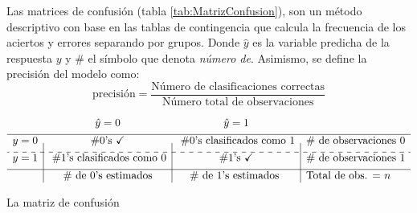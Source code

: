 \documentclass[../Main/Main.tex]{subfiles}
\begin{document}
Las matrices de confusión (tabla \ref{tab:MatrizConfusion}), son un método descriptivo con base en las tablas de contingencia que calcula la frecuencia de los aciertos y errores separando por grupos. Donde $\hat{y}$ es la variable predicha de la respuesta $y$ y $\#$ el símbolo que denota \textit{número de}. Asimismo, se define la precisión del modelo como:
$$ \text{precisión} = \dfrac{\text{Número de clasificaciones correctas}}{\text{Número total de observaciones}}$$

\begin{table}[H]
\centering
$\begin{array}{c|c|c|l}
~ & \hat{y} = 0 & \hat{y} = 1 & ~ \\[4pt]
\hline
y = 0 & \#0\text{'s } \checkmark & \;\# 0\text{'s clasificados como }1 & \#\text{ de observaciones 0} \\[4pt]
\cdashline{1-4}
y = 1 & \;\# 1\text{'s clasificados como }0 & \# 1\text{'s } \checkmark & \#\text{ de observaciones 1} \\[4pt]
\hline
~ & \# \text{ de 0's estimados} & \# \text{ de 1's estimados } &  \text{Total de obs. = } n
\end{array}$
\caption{La matriz de confusión}
\label{tab:MatrizConfusion}
\end{table}
\end{document}
